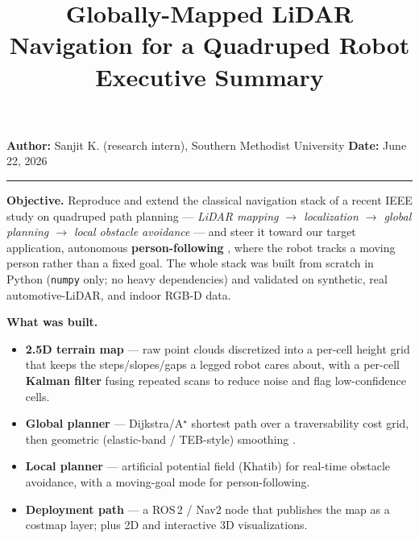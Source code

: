 \documentclass[11pt]{article}
\title{\vspace{-1em}\textbf{\large Globally-Mapped LiDAR Navigation for a Quadruped Robot}\\[-0.2em]
\normalsize Executive Summary}
\author{}
\date{}
\begin{document}
\maketitle
\vspace{-3.5em}

\noindent\small
\textbf{Author:} Sanjit K. (research intern), Southern Methodist University \hfill
\textbf{Date:} June 22, 2026\\[2pt]
\rule{\linewidth}{0.4pt}

\vspace{2pt}
\noindent\textbf{Objective.}
Reproduce and extend the classical navigation stack of a recent IEEE study on
quadruped path planning \cite{refpaper} --- \emph{LiDAR mapping $\rightarrow$
localization $\rightarrow$ global planning $\rightarrow$ local obstacle avoidance}
--- and steer it toward our target application, autonomous \textbf{person-following}
\cite{islam2019}, where the robot tracks a moving person rather than a fixed goal.
The whole stack was built from scratch in Python (\texttt{numpy} only; no heavy
dependencies) and validated on synthetic, real automotive-LiDAR, and indoor RGB-D data.

\vspace{4pt}
\noindent\textbf{What was built.}
\begin{itemize}
  \item \textbf{2.5D terrain map} --- raw point clouds discretized into a per-cell
  height grid that keeps the steps/slopes/gaps a legged robot cares about, with a
  per-cell \textbf{Kalman filter} \cite{kalman1960,fankhauser2018} fusing repeated
  scans to reduce noise and flag low-confidence cells.
  \item \textbf{Global planner} --- Dijkstra/A$^\star$ shortest path
  \cite{dijkstra1959,hart1968} over a traversability cost grid, then geometric
  (elastic-band / TEB-style) smoothing \cite{rosmann2017}.
  \item \textbf{Local planner} --- artificial potential field (Khatib)
  \cite{khatib1986} for real-time obstacle avoidance, with a moving-goal mode for
  person-following.
  \item \textbf{Deployment path} --- a ROS\,2 / Nav2 node \cite{macenski2020} that
  publishes the map as a costmap layer; plus 2D and interactive 3D visualizations.
\end{itemize}
\end{document}
